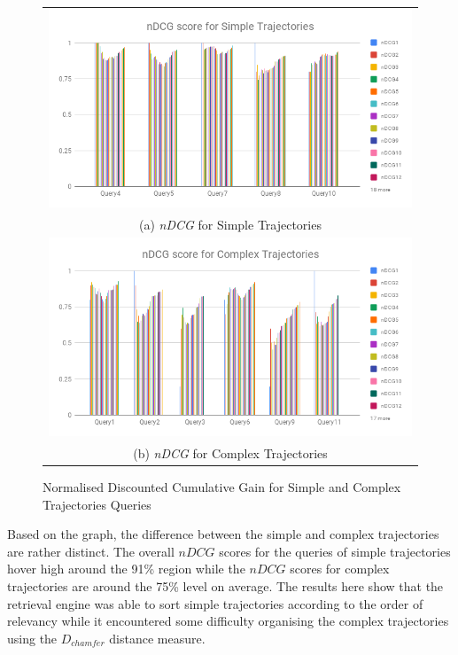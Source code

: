 \begin{figure}[tb!]
  \centering
  \begin{tabular}{c}
   \includegraphics[width=0.9\linewidth]{image/retrievalTwo/ndcgSimple.png}\\
   (a) \textit{nDCG} for Simple Trajectories \\
   \includegraphics[width=0.9\linewidth]{image/retrievalTwo/ndcgComplex.png} \\
   (b) \textit{nDCG} for Complex Trajectories
  \end{tabular}
  \caption{Normalised Discounted Cumulative Gain for Simple and Complex
  Trajectories Queries}
  \label{fig:versionTwoNDCG}
\end{figure}

Based on the graph, the difference between the simple and complex trajectories are rather distinct. The overall $nDCG$ scores for the queries of simple trajectories hover high around the 91\% region while the $nDCG$ scores for complex trajectories are around the 75\% level on average. The results here show that the retrieval engine was able to sort simple trajectories according to the order of relevancy while it encountered some difficulty organising the complex trajectories using the $D_{chamfer}$ distance measure.

